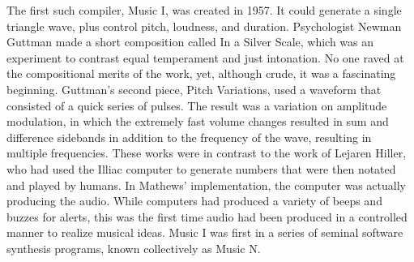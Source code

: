 The first such compiler, Music I, was created in 1957. It could generate a single triangle wave, plus control pitch, loudness, and duration. Psychologist Newman Guttman made a short composition called In a Silver Scale, which was an experiment to contrast equal temperament and just intonation. No one raved at the compositional merits of the work, yet, although crude, it was a fascinating beginning. Guttman's second piece, Pitch Variations, used a waveform that consisted of a quick series of pulses. The result was a variation on amplitude modulation, in which the extremely fast volume changes resulted in sum and difference sidebands in addition to the frequency of the wave, resulting in multiple frequencies. These works were in contrast to the work of Lejaren Hiller, who had used the Illiac computer to generate numbers that were then notated and played by humans. In Mathews' implementation, the computer was actually producing the audio. While computers had produced a variety of beeps and buzzes for alerts, this was the first time audio had been produced in a controlled manner to realize musical ideas. Music I was first in a series of seminal software synthesis programs, known collectively as Music N.

